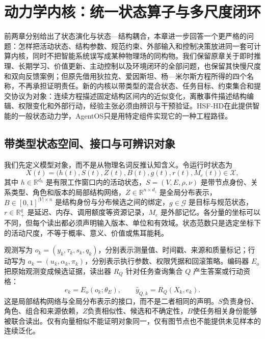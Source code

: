 \chapter{动力学内核：统一状态算子与多尺度闭环}
\label{chp:dynamics_kernel_ch}

前两章分别给出了状态演化与状态—结构耦合，本章进一步回答一个更严格的问题：怎样把活动状态、结构参数、规范约束、外部输入和控制决策放进同一套可计算内核，同时不把智能系统误写成某种物理场的同构物。我们保留原章关于即时推理、长期学习、价值更新、主动控制以及环境闭环的全部问题，也保留其快慢尺度和双向反馈案例；但原先借用狄拉克、爱因斯坦、杨—米尔斯方程所得的四个名称，不再承担证明责任。新的内核以带类型的混合状态、任务目标、约束集合和提交协议为对象：连续方程描述固定结构区间内的近似变化，离散事件描述结构编辑、权限变化和外部行动，经验主张必须由辨识与干预验证。HSF-HD在此提供智能的一般状态动力学，AgentOS只是用特定组件实现它的一种工程路径。

\section{带类型状态空间、接口与可辨识对象}
\label{sec:section_9973}

我们先定义模型对象，而不是从物理名词反推认知含义。令运行时状态为
\begin{equation}
X(t)=\bigl(h(t),S(t),Z(t),B(t),g(t),r(t),M_e(t)\bigr)\in\mathcal X ,
\end{equation}
其中 $h\in\mathbb R^{d_h}$ 是有限工作窗口内的活动状态，$S=(V,E,\rho,\nu)$ 是带节点身份、关系类型、角色和版本的局部结构网络，$Z\in\mathbb R^{n\times d_z}$ 是全局分布表示，$B\in[0,1]^{|V|\times n}$ 是结构身份与分布候选之间的绑定，$g\in\mathcal G$ 是目标与规范状态，$r\in\mathbb R_+^q$ 是延迟、内存、调用额度等资源记录，$M_e$ 是外部记忆。各分量的坐标可以不同，但每个读出都必须声明输入版本、单位和有效域。状态范数只是选定坐标下的活动尺度，不等于概率、意义、价值或焦耳能耗。

观测写为 $o_k=(y_k,\tau_k,s_k,q_k)$，分别表示测量值、时间戳、来源和质量标记；行动写为 $a_k=(u_k,\alpha_k,\pi_k)$，分别表示执行参数、权限凭据和回滚策略。编码器 $E_o$ 把原始观测变成候选证据，读出器 $R_Q$ 针对任务查询集合 $Q$ 产生答案或行动资格：
\begin{equation}
e_k=E_o(o_k;\theta_E),\qquad \hat y_{Q,k}=R_Q(X_k,e_k).
\end{equation}
这是局部结构网络与全局分布表示的接口，而不是二者相同的声明。$S$负责身份、角色、组合和来源依赖，$Z$负责相似性、候选和不确定性，$B$使任务相关身份能够被联合读出。仅有向量相似不能证明对象同一，仅有图节点也不能提供未见样本的连续泛化。

